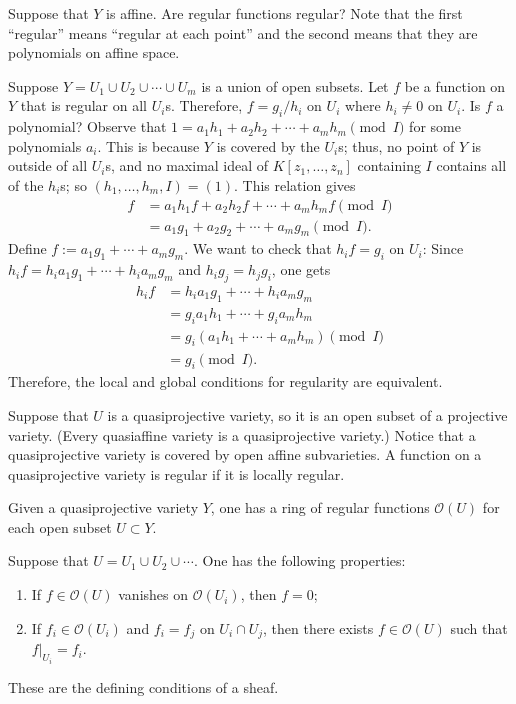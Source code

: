 \documentclass [11 pt, oneside] {article}
\begin{document}
\begin{problem}
	Suppose that $Y$ is affine. Are regular functions regular? Note that the first ``regular'' means ``regular at each point'' and the second means that they are polynomials on affine space.
\end{problem}

Suppose $Y=U_1\cup U_2\cup \cdots \cup U_m$ is a union of open subsets. Let $f$ be a function on $Y$ that is regular on all $U_i$s. Therefore, $f=g_i/h_i$ on $U_i$ where $h_i\ne 0 $ on $U_i$. Is $f$ a polynomial? Observe that $1= a_1h_1 + a_2h_2 + \cdots +a_mh_m\pmod I$ for some polynomials $a_i$. This is because $Y$ is covered by the $U_i$s; thus, no point of $Y$ is outside of all $U_i$s, and no maximal ideal of $K[z_1,\hdots,z_n]$ containing $I$ contains all of the $h_i$s; so $(h_1,\hdots, h_m, I)=(1)$. This relation gives
\begin{align*}
	f &= a_1h_1f + a_2h_2f + \cdots + a_mh_mf \pmod I\\
	  &= a_1g_1 + a_2g_2+\cdots + a_mg_m \pmod I.
\end{align*}
Define $f:= a_1g_1+\cdots + a_mg_m$. We want to check that $h_if = g_i$ on $U_i$: Since $h_if = h_ia_1g_1 +\cdots + h_ia_mg_m$ and $h_ig_j = h_jg_i$, one gets
\begin{align*}
	h_if &= h_ia_1g_1 +\cdots + h_ia_mg_m\\
	     &= g_ia_1h_1 + \cdots + g_ia_mh_m\\
	     &= g_i(a_1h_1+\cdots+a_mh_m)\pmod I\\
	     &= g_i \pmod I.
\end{align*}
Therefore, the local and global conditions for regularity are equivalent.

Suppose that $U$ is a quasiprojective variety, so it is an open subset of a projective variety. (Every quasiaffine variety is a quasiprojective variety.) Notice that a quasiprojective variety is covered by open affine subvarieties. A function on a quasiprojective variety is  regular if it is locally regular.

Given a quasiprojective variety $Y$, one has a ring of regular functions $\mathscr{O}(U)$ for each open subset $U\subset Y$. 

Suppose that $U= U_1\cup U_2\cup \cdots$. One has the following properties:
\begin{enumerate}
	\item If $f\in \mathscr{O}(U) $ vanishes on $\mathscr{O}(U_i) $, then $f = 0$;
	\item If $f_i\in \mathscr{O}(U_i) $ and $f_i = f_j$ on $U_i\cap U_j$, then there exists $f\in \mathscr{O}(U) $ such that $f \big |_{U_i} = f_i$.
\end{enumerate}
These are the defining conditions of a sheaf.
\end{document}
